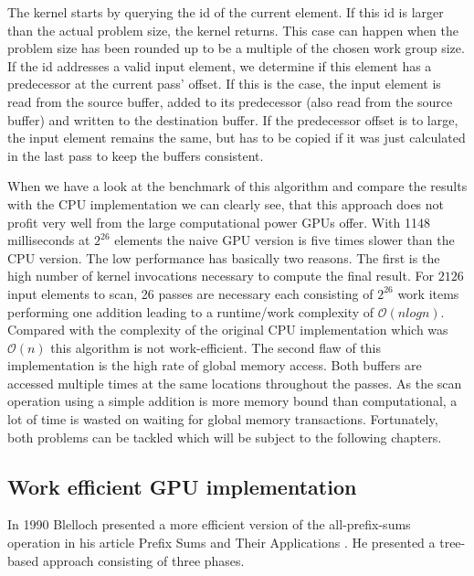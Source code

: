 

The kernel starts by querying the id of the current element. If this id is larger than the actual problem size, the kernel returns. This case can happen when the problem size has been rounded up to be a multiple of the chosen work group size. If the id addresses a valid input element, we determine if this element has a predecessor at the current pass' offset. If this is the case, the input element is read from the source buffer, added to its predecessor (also read from the source buffer) and written to the destination buffer. If the predecessor offset is to large, the input element remains the same, but has to be copied if it was just calculated in the last pass to keep the buffers consistent.

When we have a look at the benchmark of this algorithm and compare the results with the CPU implementation we can clearly see, that this approach does not profit very well from the large computational power GPUs offer. With 1148 milliseconds at $2^{26}$ elements the naive GPU version is five times slower than the CPU version. The low performance has basically two reasons. The first is the high number of kernel invocations necessary to compute the final result. For $21{26}$ input elements to scan, 26 passes are necessary each consisting of $2^{26}$ work items performing one addition leading to a runtime/work complexity of $\mathcal{O}(n log n)$. Compared with the complexity of the original CPU implementation which was $\mathcal{O}(n)$ this algorithm is not work-efficient. The second flaw of this implementation is the high rate of global memory access. Both buffers are accessed multiple times at the same locations throughout the passes. As the scan operation using a simple addition is more memory bound than computational, a lot of time is wasted on waiting for global memory transactions.
Fortunately, both problems can be tackled which will be subject to the following chapters.


\subsection{Work efficient GPU implementation}
\label{sec:scan_work_efficient}

In 1990 Blelloch presented a more efficient version of the all-prefix-sums operation in his article Prefix Sums and Their Applications \cite{scan_blelloch}. He presented a tree-based approach consisting of three phases.

